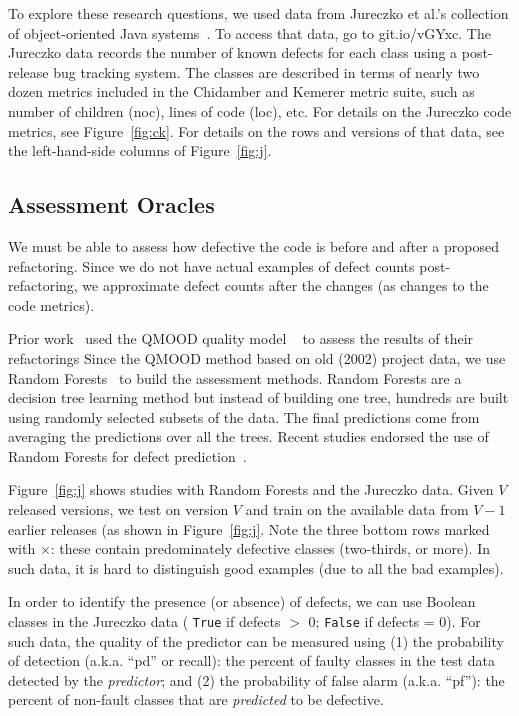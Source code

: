 \documentclass{sig-alternate}
\newcommand{\fig}[1]{Figure~\ref{fig:#1}}
\theoremstyle{break}
\begin{document}
\begin{itemize}
To explore these research questions,
we used data from
Jureczko et al.'s collection of object-oriented Java systems~\cite{jureczko10}. To access that data, go to   git.io/vGYxc.
The Jureczko data records the number of known defects for each class using a post-release bug tracking system. The classes are described in terms of nearly two dozen metrics included in the Chidamber and Kemerer metric suite, such as number of children (noc), lines of code (loc), etc. For details on the Jureczko code
metrics, see  \fig{ck}. For details on the rows and versions
of that data, see the left-hand-side columns of \fig{j}.



 
\subsection{Assessment Oracles}
\label{sect:eval}
We must be able to assess how defective the code is before and after a proposed refactoring. Since we do not have actual  examples of defect counts post-refactoring, we   approximate   defect counts after the   changes   (as changes to the code metrics).

Prior work~\cite{Cheng10,OKeeffe08,OKeeffe07,Moghadam2011,Mkaouer14} 
used the QMOOD   quality model ~\cite{Bansiya02} to assess the results of their refactorings
Since the QMOOD method based on old (2002) project data, we use Random Forests~\cite{Breiman2001} to build
the assessment methods.
  Random Forests are a decision tree learning method but
  instead of building one tree, hundreds are built using
  randomly selected subsets of the data. The final predictions
  come from averaging the predictions over all the trees.
  Recent studies endorsed the use
  of  Random Forests for  defect prediction~\cite{lessmann}.
  
\fig{j} shows   studies with Random Forests and
the Jureczko data. Given   $V$ released versions, we test on version $V$ and train on the available data from $V-1$ earlier releases (as shown in \fig{j}. Note the   \colorbox{lavenderpink}{three bottom rows}   marked with $\times$: these contain predominately defective classes (two-thirds, or more).  In such data, it is hard to distinguish good examples (due to all the bad examples). 

In order to identify the presence (or absence) of defects, we can   use Boolean classes in the  Jureczko data ( \texttt{True} if defects $\gt$ 0; \texttt{False} if defects = 0). For such data, the quality of the predictor can be measured using (1) the  probability of detection (a.k.a. ``pd'' or recall):  the percent of faulty classes in the test data detected by the {\em predictor}; and (2) the  probability of false alarm (a.k.a. ``pf''): the percent of non-fault classes that are {\em predicted} to be defective.


\end{itemize}
\end{document}
